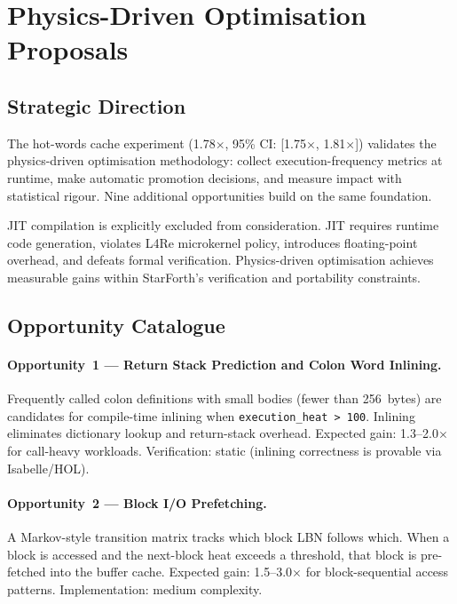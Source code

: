 
\section{Physics-Driven Optimisation Proposals}
\label{sec:physics-opt-proposals}

\subsection{Strategic Direction}

The hot-words cache experiment (1.78$\times$, 95\% CI: [1.75$\times$,
1.81$\times$]) validates the physics-driven optimisation methodology:
collect execution-frequency metrics at runtime, make automatic promotion
decisions, and measure impact with statistical rigour. Nine additional
opportunities build on the same foundation.

JIT compilation is explicitly excluded from consideration. JIT requires
runtime code generation, violates L4Re microkernel policy, introduces
floating-point overhead, and defeats formal verification. Physics-driven
optimisation achieves measurable gains within StarForth's verification and
portability constraints.

\subsection{Opportunity Catalogue}

\paragraph{Opportunity~1 — Return Stack Prediction and Colon Word Inlining.}
Frequently called colon definitions with small bodies (fewer than 256~bytes)
are candidates for compile-time inlining when \texttt{execution\_heat > 100}.
Inlining eliminates dictionary lookup and return-stack overhead.
Expected gain: 1.3--2.0$\times$ for call-heavy workloads. Verification:
static (inlining correctness is provable via Isabelle/HOL).

\paragraph{Opportunity~2 — Block I/O Prefetching.}
A Markov-style transition matrix tracks which block LBN follows which.
When a block is accessed and the next-block heat exceeds a threshold, that
block is pre-fetched into the buffer cache. Expected gain: 1.5--3.0$\times$
for block-sequential access patterns. Implementation: medium complexity.

